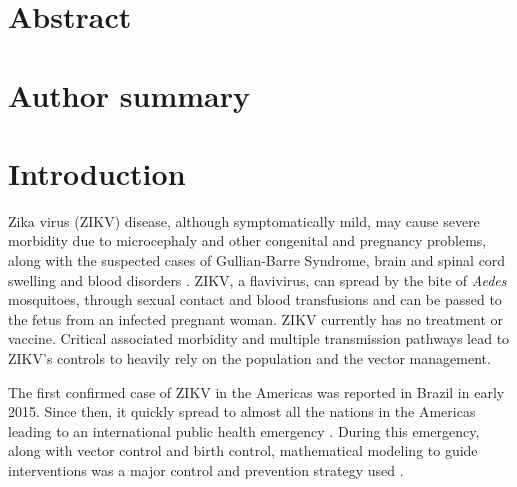 \documentclass[10pt,letterpaper]{article}
\begin{document}
\section*{Abstract}



\section*{Author summary}

\linenumbers

    


\section*{Introduction}
Zika virus (ZIKV) disease, although symptomatically mild, may cause severe morbidity due to microcephaly and other congenital and pregnancy problems, along with the suspected cases of Gullian-Barre Syndrome, brain and spinal cord swelling and blood disorders \cite{paixao2016history,da2017neurologic}. ZIKV, a flavivirus, can spread by the bite of \textit{Aedes} mosquitoes, through sexual contact and blood transfusions and can be passed to the fetus from an infected pregnant woman. ZIKV currently has no treatment or vaccine. Critical associated morbidity and multiple transmission pathways lead to ZIKV's controls to heavily rely on the population and the vector management.

The first confirmed case of ZIKV in the Americas was reported in Brazil in early 2015. Since then, it quickly spread to almost all the nations in the Americas leading to an international public health emergency \cite{heukelbach2016zika}. During this emergency, along with vector control and birth control, mathematical modeling to guide interventions was a major control and prevention strategy used \cite{lowe2018zika}.
\end{document}
